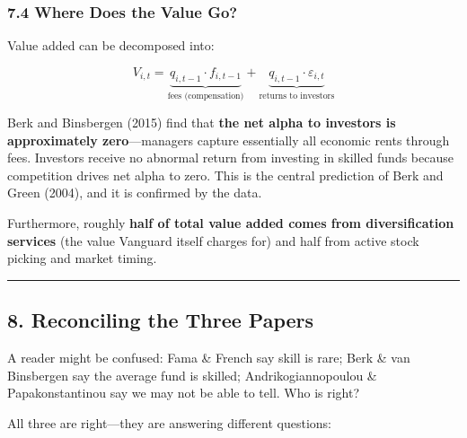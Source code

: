 \documentclass[
  letterpaper,
  DIV=11,
  numbers=noendperiod]{scrartcl}
\begin{document}
\subsubsection{7.4 Where Does the Value
Go?}\label{where-does-the-value-go}

Value added can be decomposed into:

\[V_{i,t} = \underbrace{q_{i,t-1} \cdot f_{i,t-1}}_{\text{fees (compensation)}} + \underbrace{q_{i,t-1} \cdot \varepsilon_{i,t}}_{\text{returns to investors}}\]

Berk and Binsbergen (2015) find that \textbf{the net alpha to investors
is approximately zero}---managers capture essentially all economic rents
through fees. Investors receive no abnormal return from investing in
skilled funds because competition drives net alpha to zero. This is the
central prediction of Berk and Green (2004), and it is confirmed by the
data.

Furthermore, roughly \textbf{half of total value added comes from
diversification services} (the value Vanguard itself charges for) and
half from active stock picking and market timing.

\begin{center}\rule{0.5\linewidth}{0.5pt}\end{center}

\subsection{8. Reconciling the Three
Papers}\label{reconciling-the-three-papers}

A reader might be confused: Fama \& French say skill is rare; Berk \&
van Binsbergen say the average fund is skilled; Andrikogiannopoulou \&
Papakonstantinou say we may not be able to tell. Who is right?

All three are right---they are answering different questions:
\end{document}
